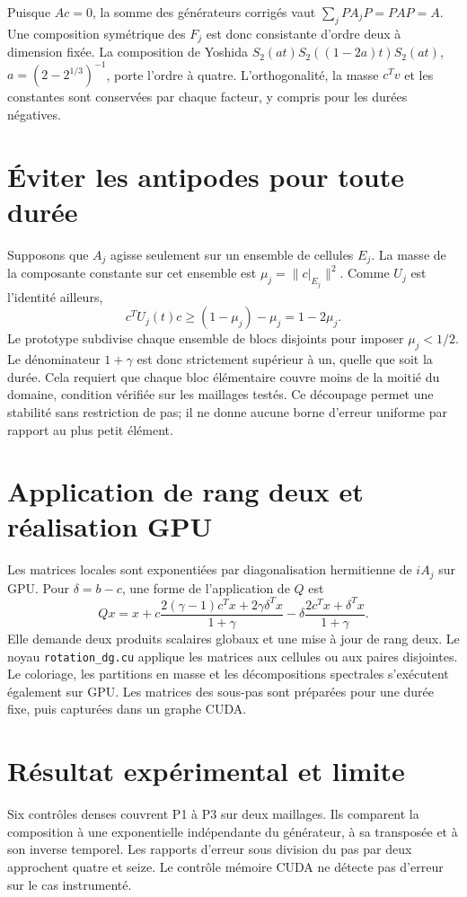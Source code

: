 \documentclass[11pt,a4paper]{article}
\begin{document}
Puisque $Ac=0$, la somme des générateurs corrigés vaut
$\sum_j P A_j P=PAP=A$. Une composition symétrique des $F_j$ est donc
consistante d'ordre deux à dimension fixée. La composition de Yoshida
$S_2(at)S_2((1-2a)t)S_2(at)$, $a=(2-2^{1/3})^{-1}$, porte l'ordre à quatre.
L'orthogonalité, la masse $c^Tv$ et les constantes sont conservées par
chaque facteur, y compris pour les durées négatives.

\section{Éviter les antipodes pour toute durée}
Supposons que $A_j$ agisse seulement sur un ensemble de cellules $E_j$.
La masse de la composante constante sur cet ensemble est
$\mu_j=\|c|_{E_j}\|^2$. Comme $U_j$ est l'identité ailleurs,
\[
 c^TU_j(t)c\geq (1-\mu_j)-\mu_j=1-2\mu_j.
\]
Le prototype subdivise chaque ensemble de blocs disjoints pour imposer
$\mu_j<1/2$. Le dénominateur $1+\gamma$ est donc strictement supérieur à un,
quelle que soit la durée. Cela requiert que chaque bloc élémentaire couvre
moins de la moitié du domaine, condition vérifiée sur les maillages testés.
Ce découpage permet une stabilité sans restriction de pas; il ne donne
aucune borne d'erreur uniforme par rapport au plus petit élément.

\section{Application de rang deux et réalisation GPU}
Les matrices locales sont exponentiées par diagonalisation hermitienne de
$iA_j$ sur GPU. Pour $\delta=b-c$, une forme de l'application de $Q$ est
\[
 Qx=x+c\frac{2(\gamma-1)c^Tx+2\gamma\delta^Tx}{1+\gamma}
       -\delta\frac{2c^Tx+\delta^Tx}{1+\gamma}.
\]
Elle demande deux produits scalaires globaux et une mise à jour de rang deux.
Le noyau \texttt{rotation\_dg.cu} applique les matrices aux cellules ou aux
paires disjointes. Le coloriage, les partitions en masse et les décompositions
spectrales s'exécutent également sur GPU. Les matrices des sous-pas sont
préparées pour une durée fixe, puis capturées dans un graphe CUDA.

\section{Résultat expérimental et limite}
Six contrôles denses couvrent P1 à P3 sur deux maillages. Ils comparent la
composition à une exponentielle indépendante du générateur, à sa transposée
et à son inverse temporel. Les rapports d'erreur sous division du pas par
deux approchent quatre et seize. Le contrôle mémoire CUDA ne détecte pas
d'erreur sur le cas instrumenté.
\end{document}
